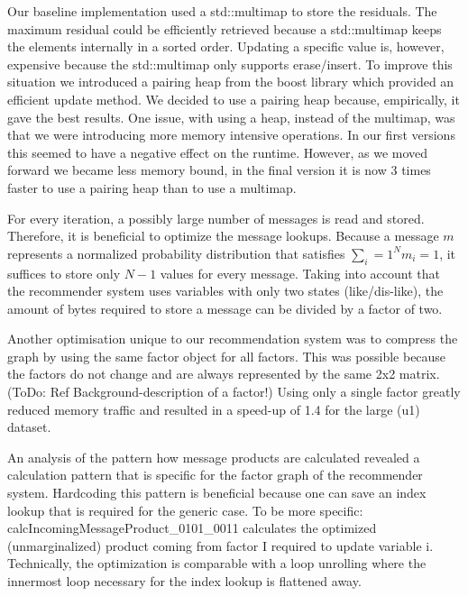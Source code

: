 Our baseline implementation used a std::multimap to store the residuals. The maximum residual could be efficiently retrieved because a std::multimap keeps the elements internally in a sorted order. Updating a specific value is, however, expensive because the std::multimap only supports erase/insert. To improve this situation we introduced a pairing heap from the boost library which provided an efficient update method. We decided to use a pairing heap because, empirically, it gave the best results. One issue, with using a heap, instead of the multimap, was that we were introducing more memory intensive operations. In our first versions this seemed to have a negative effect on the runtime. However, as we moved forward we became less memory bound, in the final version it is now 3 times faster to use a pairing heap than to use a multimap.

For every iteration, a possibly large number of messages is read and stored. Therefore, it is beneficial to optimize the message lookups. Because a message $m$ represents a normalized probability distribution that satisfies $\sum_i=1^N m_i = 1$, it suffices to store only $N-1$ values for every message. Taking into account that the recommender system uses variables with only two states (like/dis-like), the amount of bytes required to store a message can be divided by a factor of two. 

Another optimisation unique to our recommendation system was to compress the graph by using the same factor object for all factors. This was possible because the factors do not change and are always represented by the same 2x2 matrix. (ToDo: Ref Background-description of a factor!) Using only a single factor greatly reduced memory traffic and resulted in a speed-up of 1.4 for the large (u1) dataset.


An analysis of the pattern how message products are calculated revealed a calculation pattern that is specific for the factor graph of the recommender system. Hardcoding this pattern is beneficial because one can save an index lookup that is required for the generic case. To be more specific: calcIncomingMessageProduct\_0101\_0011 calculates the optimized (unmarginalized) product coming from factor I required to update variable i. 
Technically, the optimization is comparable with a loop unrolling where the innermost loop necessary for the index lookup is flattened away.

